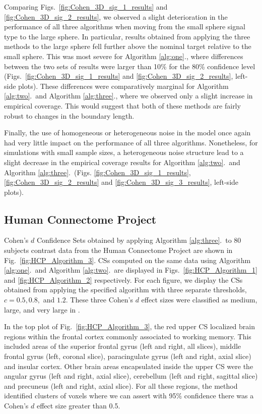 Comparing Figs.\ \ref{fig:Cohen_3D_sig_1_results} and \ref{fig:Cohen_3D_sig_2_results}, we observed a slight deterioration in the performance of all three algorithms when moving from the small sphere signal type to the large sphere. In particular, results obtained from applying the three methods to the large sphere fell further above the nominal target relative to the small sphere. This was most severe for Algorithm \ref{alg:one}., where differences between the two sets of results were larger than 10\% for the 80\% confidence level (Figs.\ \ref{fig:Cohen_3D_sig_1_results} and \ref{fig:Cohen_3D_sig_2_results}, left-side plots). These differences were comparatively marginal for Algorithm \ref{alg:two}.\ and Algorithm \ref{alg:three}., where we observed only a slight increase in empirical coverage. This would suggest that both of these methods are fairly robust to changes in the boundary length.

Finally, the use of homogeneous or heterogeneous noise in the model once again had very little impact on the performance of all three algorithms. Nonetheless, for simulations with small sample sizes, a heterogeneous noise structure lead to a slight decrease in the empirical coverage results for Algorithm \ref{alg:two}.\ and Algorithm \ref{alg:three}.\ (Figs. \ref{fig:Cohen_3D_sig_1_results}, \ref{fig:Cohen_3D_sig_2_results} and \ref{fig:Cohen_3D_sig_3_results}, left-side plots).

\subsection{Human Connectome Project} 
Cohen's $d$ Confidence Sets obtained by applying Algorithm \ref{alg:three}.\ to 80 subjects contrast data from the Human Connectome Project are shown in Fig.\ \ref{fig:HCP_Algorithm_3}. CSs computed on the same data using Algorithm \ref{alg:one}.\ and Algorithm \ref{alg:two}.\ are displayed in Figs.\ \ref{fig:HCP_Algorithm_1} and \ref{fig:HCP_Algorithm_2} respectively. For each figure, we display the CSs obtained from applying the specified algorithm with three separate thresholds, $c= 0.5, 0.8,$ and $1.2$. These three Cohen's $d$ effect sizes were classified as medium, large, and very large in \textit{\citet*{Cohen2013-it}}.

In the top plot of Fig.\ \ref{fig:HCP_Algorithm_3}, the red upper CS localized brain regions within the frontal cortex commonly associated to working memory. This included areas of the superior frontal gyrus (left and right, all slices), middle frontal gyrus (left, coronal slice), paracingulate gyrus (left and right, axial slice) and insular cortex. Other brain areas encapsulated inside the upper CS were the angular gyrus (left and right, axial slice), cerebellum (left and right, sagittal slice) and precuneus (left and right, axial slice). For all these regions, the method identified clusters of voxels where we can assert with 95\% confidence there was a Cohen's $d$ effect size greater than 0.5.

